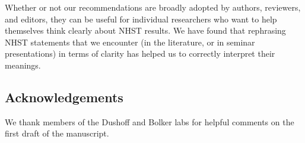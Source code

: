 Whether or not our recommendations are broadly adopted by authors, reviewers, and editors, they can be useful for individual researchers who want to help themselves think clearly about NHST results. We have found that rephrasing NHST statements that we encounter (in the literature, or in seminar presentations) in terms of clarity has helped us to correctly interpret their meanings.

\subsection*{Acknowledgements}

We thank members of the Dushoff and Bolker labs for helpful comments on the first draft of the manuscript.


